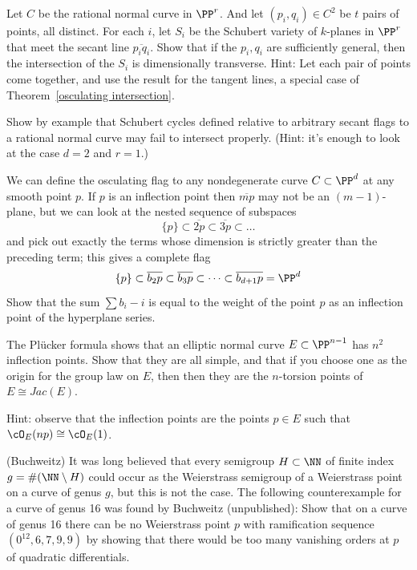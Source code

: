 \begin{exercise}\label{independent secants}
Let $C$ be the rational normal curve in $\PP^{r}$. And let $(p_{i}, q_{i})\in  C^{2}$ be $t$ pairs of points, all distinct.
For each $i$, let $S_{i}$ be the Schubert variety of $k$-planes in $\PP^{r}$ that meet the secant line
$\overline{p_{i}q_{i}}$. Show that if the $p_{i}, q_{i}$ are sufficiently general, then the intersection
of the $S_{i}$ is dimensionally transverse. Hint: Let each pair of points come together, and use the result
for the tangent lines, a special case of Theorem~\ref{osculating intersection}.
\end{exercise}

\begin{exercise}\label{only general secants}
Show by example that Schubert cycles defined relative to arbitrary secant flags to a rational normal curve may fail to intersect properly. (Hint: it's enough to look at the case $d=2$ and $r=1$.)
\end{exercise}

\begin{exercise}
We can define the osculating flag to any nondegenerate curve $C \subset \PP^d$ at any smooth point $p$. If $p$ is an inflection point then $\overline{mp}$ may not be an $(m-1)$-plane, but we can look at the nested sequence of subspaces
$$
\{p\} \subset \overline{2p} \subset \overline{3p} \subset \dots 
$$
and pick out exactly the terms whose dimension is strictly greater than the preceding term; this gives a complete flag
$$
\{p\} \subset \overline{b_2p} \subset \overline{b_3p} \subset \dots \subset \overline{b_{d+1}p} = \PP^d
$$
Show that the sum $\sum b_i - i$ is equal to the weight of the point $p$ as an inflection point of the hyperplane series.
\end{exercise}


\begin{exercise}
The Pl\"ucker formula shows that an elliptic normal curve $E\subset \PP^{n-1}$ has $n^2$ inflection points. Show that they are
all simple, and that if you choose one as the origin for the group law on $E$, then 
then they are the $n$-torsion points of  $E \cong Jac(E)$.

Hint: observe that the inflection points are the points $p \in E$ such that $\cO_E(np) \cong \cO_E(1)$.
\end{exercise}

\begin{exercise}(Buchweitz)
It was long believed that every semigroup $H \subset \NN$ of finite index $g = \#(\NN \setminus H)$ could occur as the Weierstrass semigroup of a Weierstrass
point on a curve of genus $g$, but this is not the case. The following counterexample for a curve of genus 16 was found by Buchweitz (unpublished): Show that on a curve of genus 16 there can be no Weierstrass point $p$ with ramification sequence
$(0^{12}, 6,7,9,9)$ by showing that there would be too many vanishing orders at $p$ of quadratic differentials.
 \end{exercise}

